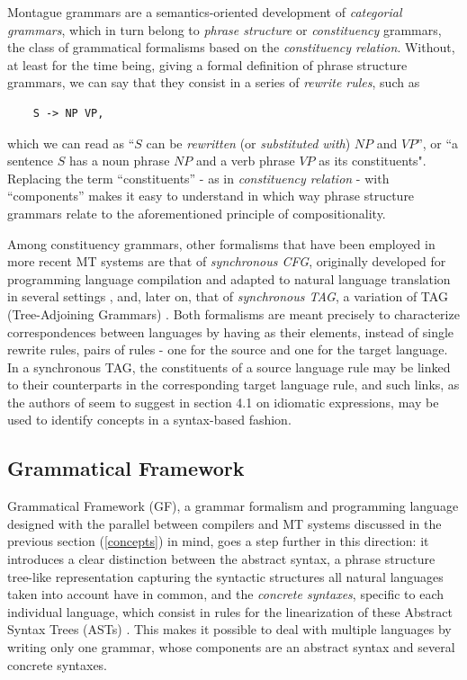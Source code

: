 \documentclass{article}
\begin{document}
Montague grammars are a semantics-oriented development of \textit{categorial grammars}, which in turn belong to \textit{phrase structure} or \textit{constituency} grammars, the class of grammatical formalisms based on the \textit{constituency relation}. 
Without, at least for the time being, giving a formal definition of phrase structure grammars, we can say that they consist in a series of \textit{rewrite rules}, such as 
\begin{lstlisting}
    S -> NP VP,
\end{lstlisting}
which we can read as ``$S$ can be \textit{rewritten} (or \textit{substituted with}) $\mathit{NP}$ and $\mathit{VP}$'', or ``a sentence $S$ has a noun phrase $\mathit{NP}$ and a verb phrase $\mathit{VP}$ as its constituents". Replacing the term ``constituents'' - as in \textit{constituency relation} - with ``components'' makes it easy to understand in which way phrase structure grammars relate to the aforementioned principle of compositionality.

Among constituency grammars, other formalisms that have been employed in more recent MT systems are that of \textit{synchronous CFG}, originally developed for programming language compilation \cite{scfg} and adapted to natural language translation in several settings \cite{nlpscfg1,nlpscfg2,nlpscfg3}, and, later on, that of \textit{synchronous TAG}, a variation of TAG (Tree-Adjoining Grammars) \cite{tag}. %
Both formalisms are meant precisely to characterize correspondences between languages by having as their elements, instead of single rewrite rules, pairs of rules - one for the source and one for the target language. In a synchronous TAG, the constituents of a source language rule may be linked to their counterparts in the corresponding target language rule, and such links, as the authors of \cite{stag} seem to suggest in section 4.1 on idiomatic expressions, may be used to identify concepts in a syntax-based fashion.

\subsection{Grammatical Framework}
Grammatical Framework (GF), a grammar formalism and programming language designed with the parallel between compilers and MT systems discussed in the previous section (\ref{concepts}) in mind, goes a step further in this direction: it introduces a clear distinction between the abstract syntax, a phrase structure tree-like representation capturing the syntactic structures all natural languages taken into account have in common, and the \textit{concrete syntaxes}, specific to each individual language, which consist in rules for the linearization of these Abstract Syntax Trees (ASTs) \cite{gf2004} \cite{gfbook}. 
This makes it possible to deal with multiple languages by writing only one grammar, whose components are an abstract syntax and several concrete syntaxes. 
\end{document}
